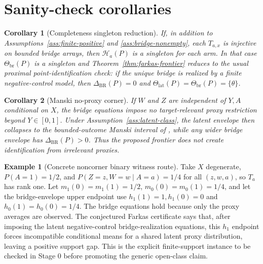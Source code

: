 \documentclass[11pt]{article}
\theoremstyle{definition}
\newtheorem{example}{Example}
\theoremstyle{plain}
\newtheorem{corollary}{Corollary}
\theoremstyle{remark}
\begin{document}
\section{Sanity-check corollaries}
\begin{corollary}[Completeness singleton reduction]\label{cor:singleton}
If, in addition to Assumptions~\ref{ass:finite-positive} and
\ref{ass:bridge-nonempty}, each \(T_{a,x}\) is injective on bounded bridge
arrays, then \(\mathcal H_a(P)\) is a singleton for each arm.  In that case
\(\Theta_{\mathrm{br}}(P)\) is a singleton and Theorem~\ref{thm:farkas-frontier}
reduces to the usual proximal point-identification check: if the unique bridge
is realized by a finite negative-control model, then
\(\Delta_{\mathrm{BR}}(P)=0\) and
\(\Theta_{\mathrm{lat}}(P)=\Theta_{\mathrm{br}}(P)=\{\theta\}\).
\end{corollary}

\begin{corollary}[Manski no-proxy corner]\label{cor:manski}
If \(W\) and \(Z\) are independent of \(Y,A\) conditional on \(X\), the bridge
equations impose no target-relevant proxy restriction beyond \(Y\in[0,1]\).
Under Assumption~\ref{ass:latent-class}, the latent envelope then collapses to
the bounded-outcome Manski interval of \citet{Manski1990}, while any wider
bridge envelope has \(\Delta_{\mathrm{BR}}(P)>0\).  Thus the proposed frontier
does not create identification from irrelevant proxies.
\end{corollary}

\begin{example}[Concrete noncorner binary witness route]\label{ex:binary-witness}
Take \(X\) degenerate, \(P(A=1)=1/2\), and \(P(Z=z,W=w\mid A=a)=1/4\) for all
\((z,w,a)\), so \(T_a\) has rank one.  Let
\(m_1(0)=m_1(1)=1/2\), \(m_0(0)=m_0(1)=1/4\), and let the bridge-envelope upper
endpoint use \(h_1(1)=1,h_1(0)=0\) and \(h_0(1)=h_0(0)=1/4\).  The bridge
equations hold because only the proxy averages are observed.  The conjectured
Farkas certificate says that, after imposing the latent negative-control
bridge-realization equations, this \(h_1\) endpoint forces incompatible
conditional means for a shared latent proxy distribution, leaving a positive
support gap.  This is the explicit finite-support instance to be checked in
Stage 0 before promoting the generic open-class claim.
\end{example}
\end{document}
